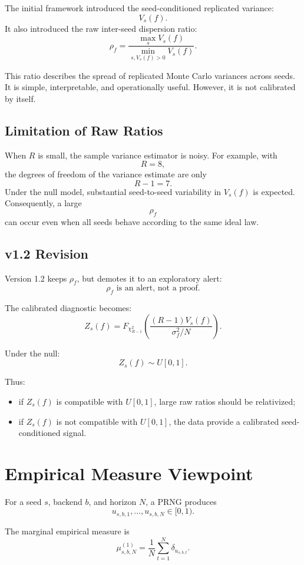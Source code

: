\documentclass[11pt,a4paper]{article}
\begin{document}
The initial framework introduced the seed-conditioned replicated variance:
\[
V_s(f).
\]
It also introduced the raw inter-seed dispersion ratio:
\[
\rho_f
=
\frac{\max_s V_s(f)}
{\min_{s,V_s(f)>0}V_s(f)}.
\]

This ratio describes the spread of replicated Monte Carlo variances across seeds. It is simple, interpretable, and operationally useful. However, it is not calibrated by itself.

\subsection{Limitation of Raw Ratios}

When \(R\) is small, the sample variance estimator is noisy. For example, with
\[
R=8,
\]
the degrees of freedom of the variance estimate are only
\[
R-1=7.
\]
Under the null model, substantial seed-to-seed variability in \(V_s(f)\) is expected. Consequently, a large
\[
\rho_f
\]
can occur even when all seeds behave according to the same ideal law.

\subsection{v1.2 Revision}

Version 1.2 keeps \(\rho_f\), but demotes it to an exploratory alert:
\[
\boxed{
\rho_f\text{ is an alert, not a proof.}
}
\]

The calibrated diagnostic becomes:
\[
Z_s(f)
=
F_{\chi^2_{R-1}}
\left(
\frac{(R-1)V_s(f)}{\sigma_f^2/N}
\right).
\]

Under the null:
\[
\boxed{
Z_s(f)\sim U[0,1].
}
\]

Thus:
\begin{itemize}
  \item if \(Z_s(f)\) is compatible with \(U[0,1]\), large raw ratios should be relativized;
  \item if \(Z_s(f)\) is not compatible with \(U[0,1]\), the data provide a calibrated seed-conditioned signal.
\end{itemize}

\section{Empirical Measure Viewpoint}

For a seed \(s\), backend \(b\), and horizon \(N\), a PRNG produces
\[
u_{s,b,1},\ldots,u_{s,b,N}\in[0,1).
\]

The marginal empirical measure is
\[
\mu^{(1)}_{s,b,N}
=
\frac1N
\sum_{t=1}^{N}
\delta_{u_{s,b,t}}.
\]
\end{document}
